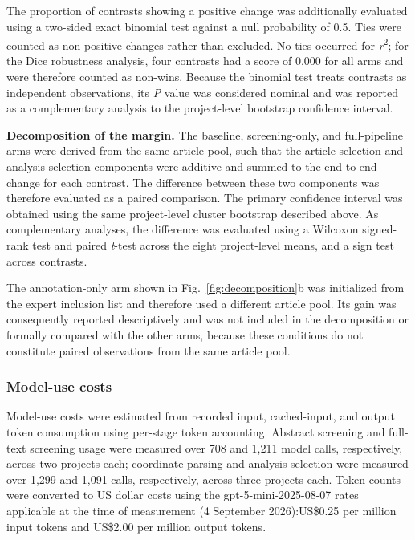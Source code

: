 The proportion of contrasts showing a positive change was additionally evaluated using a two-sided exact binomial test against a null probability of 0.5. Ties were counted as non-positive changes rather than excluded. No ties occurred for \emph{r}\textsuperscript{2}; for the Dice robustness analysis, four contrasts had a score of 0.000 for all arms and were therefore counted as non-wins. Because the binomial test treats contrasts as independent observations, its \emph{P} value was considered nominal and was reported as a complementary analysis to the project-level bootstrap confidence interval.

\textbf{Decomposition of the margin.} The baseline, screening-only, and full-pipeline arms were derived from the same article pool, such that the article-selection and analysis-selection components were additive and summed to the end-to-end change for each contrast. The difference between these two components was therefore evaluated as a paired comparison. The primary confidence interval was obtained using the same project-level cluster bootstrap described above. As complementary analyses, the difference was evaluated using a Wilcoxon signed-rank test and paired \emph{t}-test across the eight project-level means, and a sign test across contrasts.

The annotation-only arm shown in Fig.~\ref{fig:decomposition}b was initialized from the expert inclusion list and therefore used a different article pool. Its gain was consequently reported descriptively and was not included in the decomposition or formally compared with the other arms, because these conditions do not constitute paired observations from the same article pool.

\subsubsection{Model-use costs}

Model-use costs were estimated from recorded input, cached-input, and output token consumption using per-stage token accounting. Abstract screening and full-text screening usage were measured over 708 and 1,211 model calls, respectively, across two projects each; coordinate parsing and analysis selection were measured over 1,299 and 1,091 calls, respectively, across three projects each. Token counts were converted to US dollar costs using the gpt-5-mini-2025-08-07 rates applicable at the time of measurement (4 September 2026):US\$0.25 per million input tokens and US\$2.00 per million output tokens.

